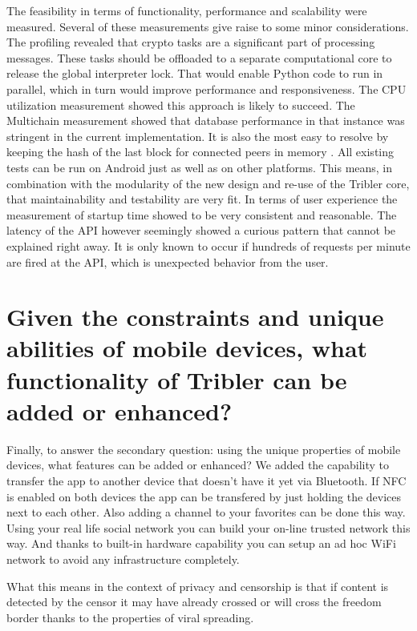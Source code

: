 


The feasibility in terms of functionality, performance and scalability were measured.
Several of these measurements give raise to some minor considerations.
The profiling revealed that crypto tasks are a significant part of processing messages.
These tasks should be offloaded to a separate computational core to release the global interpreter lock.
That would enable Python code to run in parallel, which in turn would improve performance and responsiveness.
The CPU utilization measurement showed this approach is likely to succeed.
The Multichain measurement showed that database performance in that instance was stringent in the current implementation.
It is also the most easy to resolve by keeping the hash of the last block for connected peers in memory .
All existing tests can be run on Android just as well as on other platforms.
This means, in combination with the modularity of the new design and re-use of the Tribler core, that maintainability and testability are very fit.
In terms of user experience the measurement of startup time showed to be very consistent and reasonable.
The latency of the API however seemingly showed a curious pattern that cannot be explained right away.
It is only known to occur if hundreds of requests per minute are fired at the API, which is unexpected behavior from the user.


\section{Given the constraints and unique abilities of mobile devices, what functionality of Tribler can be added or enhanced?}






Finally, to answer the secondary question: using the unique properties of mobile devices, what features can be added or enhanced?
We added the capability to transfer the app to another device that doesn't have it yet via Bluetooth.
If NFC is enabled on both devices the app can be transfered by just holding the devices next to each other.
Also adding a channel to your favorites can be done this way.
Using your real life social network you can build your on-line trusted network this way.
And thanks to built-in hardware capability you can setup an ad hoc WiFi network to avoid any infrastructure completely.


What this means in the context of privacy and censorship is that if content is detected by the censor it may have already crossed or will cross the freedom border thanks to the properties of viral spreading.

